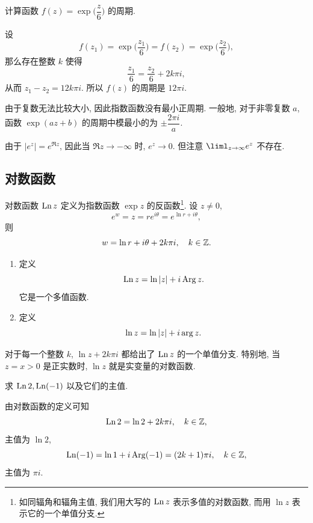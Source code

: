 \begin{example}
  计算函数 $f(z)=\exp\bigl(\dfrac z6\bigr)$ 的周期.
\end{example}
\begin{solution}
  设
  \[
     f(z_1)=\exp\bigl(\frac{z_1}6\bigr)
    =f(z_2)=\exp\bigl(\frac{z_2}6\bigr),
  \]
  那么存在整数 $k$ 使得
  \[
    \frac{z_1}6=\frac{z_2}6+2k\pi i,
  \]
  从而 $z_1-z_2=12k\pi i$.
  所以 $f(z)$ 的周期是 $12\pi i$.
\end{solution}
由于复数无法比较大小, 因此指数函数没有最小正周期.
一般地, 对于非零复数 $a$, 函数 $\exp(az+b)$ 的周期中模最小的为 $\pm\dfrac{2\pi i}a$.

由于 $|e^z|=e^{\Re z}$, 因此当 $\Re z\to-\infty$ 时, $e^z\to 0$.
但注意 $\liml_{z\to\infty}e^z$ 不存在.


\subsection{对数函数}

对数函数 $\operatorname{Ln} z$ 定义为指数函数 $\exp z$ 的反函数\footnote{%
  如同辐角和辐角主值, 我们用大写的 $\operatorname{Ln} z$ 表示多值的对数函数, 而用 $\ln z$ 表示它的一个单值分支.
}.
设 $z\neq 0$,
\[
  e^w=z=re^{i\theta}=e^{\ln r+i\theta},
\]
则
\[
  w=\ln r+i\theta+2k\pi i,\quad k\in{\mathbb{Z}}.
\]

\begin{definition}
  \begin{enumerate}
    \item 定义
      \[
        \operatorname{Ln} z=\ln\left|z\right|+i\operatorname{Arg} z.
      \]
      它是一个多值函数.
    \item 定义
      \[
        \ln z=\ln\left|z\right|+i\arg z.
      \]
  \end{enumerate}
\end{definition}

对于每一个整数 $k$, $\ln z+2k\pi i$ 都给出了 $\operatorname{Ln} z$ 的一个单值分支.
特别地, 当 $z=x>0$ 是正实数时, $\ln z$ 就是实变量的对数函数.

\begin{example}
  求 $\operatorname{Ln} 2,\operatorname{Ln}(-1)$ 以及它们的主值.
\end{example}

\begin{solution}
  由对数函数的定义可知
  \[
    \operatorname{Ln}2=\ln2+2k\pi i,\quad k\in{\mathbb{Z}},
  \]
  主值为 $\ln 2$,
  \[
    \operatorname{Ln}(-1)=\ln1+i\operatorname{Arg}(-1)=(2k+1)\pi i,\quad k\in{\mathbb{Z}},
  \]
  主值为 $\pi i$.
\end{solution}

